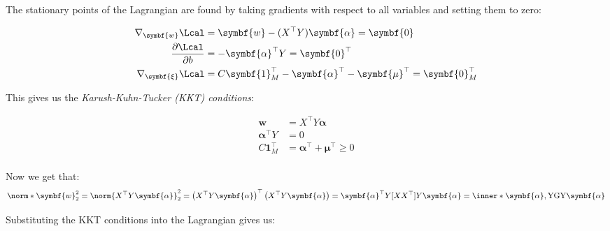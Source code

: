 The stationary points of the Lagrangian are found by taking gradients with respect to all variables and setting them to zero:

\begin{align*}
  \nabla_{\symbf{w}} \Lcal          & = \symbf{w} -  (X^\top Y) \symbf{\alpha} = \symbf{0}                             \\
  \frac{\partial \Lcal}{\partial b} & = - \symbf{\alpha}^\top Y = \symbf{0}^\top                                       \\
  \nabla_{\symbf{\xi}} \Lcal        & = C \symbf{1}_M^\top - \symbf{\alpha}^\top - \symbf{\mu}^\top = \symbf{0}_M^\top
\end{align*}

This gives us the \emph{Karush-Kuhn-Tucker (KKT) conditions}:

\begin{align*}
  \symbf{w}             & = X^\top Y \symbf{\alpha}                        \\
  \symbf{\alpha}^\top Y & = 0                                              \\
  C \symbf{1}_M^\top    & = \symbf{\alpha}^\top + \symbf{\mu}^\top  \geq 0 \\
\end{align*}

Now we get that:
\[
  \norm*{\symbf{w}}_2^2 = \norm{X^\top Y \symbf{\alpha}}_2^2 = \left(X^\top Y \symbf{\alpha}\right)^\top \left(X^\top Y \symbf{\alpha}\right) = \symbf{\alpha}^\top Y [X X^\top] Y \symbf{\alpha} = \inner*{\symbf{\alpha}, \mathrm{Y} \mathrm{G} \mathrm{Y} \symbf{\alpha}}
\]

Substituting the KKT conditions into the Lagrangian gives us:


